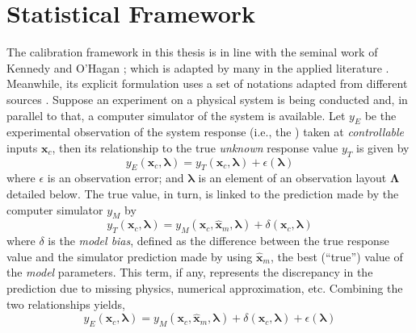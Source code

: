 \section{Statistical Framework}\label{sec:bc_statistical_framework}

The calibration framework in this thesis is in line with the seminal work of Kennedy and O'Hagan \cite{Kennedy2001};
which is adapted by many in the applied literature \cite{Bayarri2007,Higdon2008,Arendt2012,Reichert2012,Higdon2013}.
Meanwhile, its explicit formulation uses a set of notations adapted from different sources \cite{Kennedy2001,Santner2003,Huard2006,Reichert2012,Wicaksono2016}.
Suppose an experiment on a physical system is being conducted and, in parallel to that, a computer simulator of the system is available.
Let $y_E$ be the experimental observation of the system response (i.e., the ) taken at \emph{controllable} inputs $\bm{x}_c$,
then its relationship to the true \emph{unknown} response value $y_T$ is given by
\begin{equation}
    y_E(\bm{x}_c, \bm{\lambda}) = y_T (\bm{x}_c, \bm{\lambda}) + \epsilon(\bm{\lambda})
\label{eq:bc_observation_true}
\end{equation}
where $\epsilon$ is an observation error;
and $\boldsymbol{\lambda}$ is an element of an observation layout $\boldsymbol{\Lambda}$ detailed below.
The true value, in turn, is linked to the prediction made by the computer simulator $y_M$ by
\begin{equation}
    y_T(\bm{x}_c, \boldsymbol{\lambda}) = y_M (\bm{x}_c, \hat{\bm{x}}_m, \boldsymbol{\lambda}) + \delta (\bm{x}_c, \boldsymbol{\lambda})
\label{eq:bc_true_simulation}
\end{equation}
where $\delta$ is the \emph{model bias}, defined as the difference between the true response value and the simulator prediction made by using $\hat{\bm{x}}_m$, the best (``true'') value of the \emph{model} parameters.
This term, if any, represents the discrepancy in the prediction due to missing physics, numerical approximation, etc. 
Combining the two relationships yields,
\begin{equation}
    y_E(\bm{x}_c, \boldsymbol{\lambda}) = y_M (\bm{x}_c, \hat{\bm{x}}_m, \boldsymbol{\lambda}) + \delta (\bm{x}_c, \boldsymbol{\lambda}) + \epsilon(\bm{\lambda})
\label{eq:bc_observation_true}
\end{equation}
